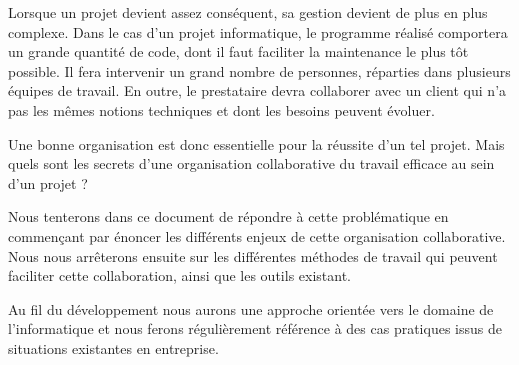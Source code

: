 
Lorsque un projet devient assez conséquent, sa gestion devient de plus en plus complexe. Dans le cas d'un projet informatique, le programme réalisé comportera un grande quantité de code, dont il faut faciliter la maintenance le plus tôt possible. Il fera intervenir un grand nombre de personnes, réparties dans plusieurs équipes de travail. En outre, le prestataire devra collaborer avec un client qui n'a pas les mêmes notions techniques et dont les besoins peuvent évoluer.

Une bonne organisation est donc essentielle pour la réussite d'un tel projet. Mais quels sont les secrets d'une organisation collaborative du travail efficace au sein d'un projet ?

Nous tenterons dans ce document de répondre à cette problématique en commençant par énoncer les différents enjeux de cette organisation collaborative. Nous nous arrêterons ensuite sur les différentes méthodes de travail qui peuvent faciliter cette collaboration, ainsi que les outils existant.

Au fil du développement nous aurons une approche orientée vers le domaine de l'informatique et nous ferons régulièrement référence à des cas pratiques issus de situations existantes en entreprise.
